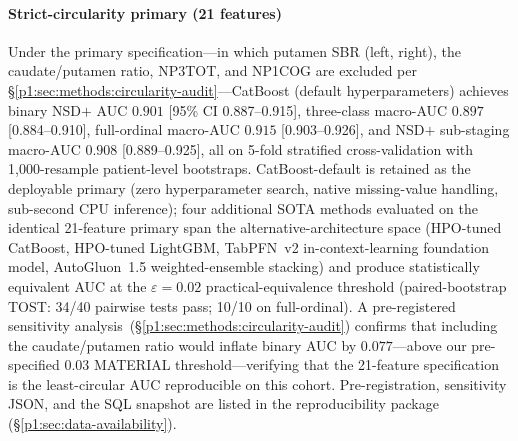 \paragraph*{Strict-circularity primary (21 features)} Under the primary specification---in which putamen SBR (left, right), the caudate/putamen ratio, NP3TOT, and NP1COG are excluded per \S\ref{p1:sec:methods:circularity-audit}---CatBoost (default hyperparameters) achieves binary NSD$+$ AUC $\mathbf{0.901}$ [95\% CI 0.887--0.915], three-class macro-AUC $0.897$ [0.884--0.910], full-ordinal macro-AUC $0.915$ [0.903--0.926], and NSD$+$ sub-staging macro-AUC $0.908$ [0.889--0.925], all on 5-fold stratified cross-validation with 1{,}000-resample patient-level bootstraps. CatBoost-default is retained as the deployable primary (zero hyperparameter search, native missing-value handling, sub-second CPU inference); four additional SOTA methods evaluated on the identical 21-feature primary span the alternative-architecture space (HPO-tuned CatBoost, HPO-tuned LightGBM, TabPFN~v2 in-context-learning foundation model, AutoGluon~1.5 weighted-ensemble stacking) and produce statistically equivalent AUC at the $\varepsilon{=}0.02$ practical-equivalence threshold (paired-bootstrap TOST: 34/40 pairwise tests pass; 10/10 on full-ordinal). A pre-registered sensitivity analysis~(\S\ref{p1:sec:methods:circularity-audit}) confirms that including the caudate/putamen ratio would inflate binary AUC by $0.077$---above our pre-specified $0.03$ MATERIAL threshold---verifying that the 21-feature specification is the least-circular AUC reproducible on this cohort. Pre-registration, sensitivity JSON, and the SQL snapshot are listed in the reproducibility package (\S\ref{p1:sec:data-availability}).

